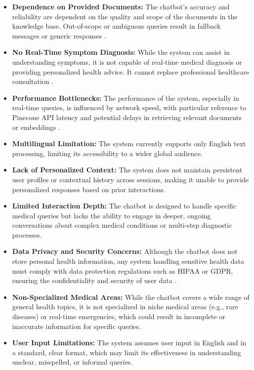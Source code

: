 \documentclass[12pt,a4paper]{report}
\begin{document}
\begin{itemize}
    \item \textbf{Dependence on Provided Documents:} The chatbot's accuracy and reliability are dependent on the quality and scope of the documents in the knowledge base. Out-of-scope or ambiguous queries result in fallback messages or generic responses \cite{pinecone}.
    \item \textbf{No Real-Time Symptom Diagnosis:} While the system can assist in understanding symptoms, it is not capable of real-time medical diagnosis or providing personalized health advice. It cannot replace professional healthcare consultation \cite{chatgpt}.
    \item \textbf{Performance Bottlenecks:} The performance of the system, especially in real-time queries, is influenced by network speed, with particular reference to Pinecone API latency and potential delays in retrieving relevant documents or embeddings \cite{pinecone}.
    \item \textbf{Multilingual Limitation:} The system currently supports only English text processing, limiting its accessibility to a wider global audience.
    \item \textbf{Lack of Personalized Context:} The system does not maintain persistent user profiles or contextual history across sessions, making it unable to provide personalized responses based on prior interactions.
    \item \textbf{Limited Interaction Depth:} The chatbot is designed to handle specific medical queries but lacks the ability to engage in deeper, ongoing conversations about complex medical conditions or multi-step diagnostic processes.
    \item \textbf{Data Privacy and Security Concerns:} Although the chatbot does not store personal health information, any system handling sensitive health data must comply with data protection regulations such as HIPAA or GDPR, ensuring the confidentiality and security of user data \cite{prompt_injection}.
    \item \textbf{Non-Specialized Medical Areas:} While the chatbot covers a wide range of general health topics, it is not specialized in niche medical areas (e.g., rare diseases) or real-time emergencies, which could result in incomplete or inaccurate information for specific queries.
    \item \textbf{User Input Limitations:} The system assumes user input in English and in a standard, clear format, which may limit its effectiveness in understanding unclear, misspelled, or informal queries.

\end{itemize}
\end{document}

